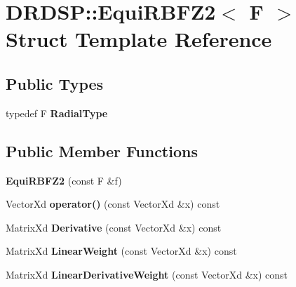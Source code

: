 \hypertarget{struct_d_r_d_s_p_1_1_equi_r_b_f_z2}{\section{D\-R\-D\-S\-P\-:\-:Equi\-R\-B\-F\-Z2$<$ F $>$ Struct Template Reference}
\label{struct_d_r_d_s_p_1_1_equi_r_b_f_z2}
}
\subsection*{Public Types}
\begin{DoxyCompactItemize}
\item 
\hypertarget{struct_d_r_d_s_p_1_1_equi_r_b_f_z2_af128dee1cc8a78c6bb9ff5c70be26cab}{typedef F {\bfseries Radial\-Type}}\label{struct_d_r_d_s_p_1_1_equi_r_b_f_z2_af128dee1cc8a78c6bb9ff5c70be26cab}

\end{DoxyCompactItemize}
\subsection*{Public Member Functions}
\begin{DoxyCompactItemize}
\item 
\hypertarget{struct_d_r_d_s_p_1_1_equi_r_b_f_z2_afbf7a21247ba5f1fd75a127c6e54fcd1}{{\bfseries Equi\-R\-B\-F\-Z2} (const F \&f)}\label{struct_d_r_d_s_p_1_1_equi_r_b_f_z2_afbf7a21247ba5f1fd75a127c6e54fcd1}

\item 
\hypertarget{struct_d_r_d_s_p_1_1_equi_r_b_f_z2_a56eba9d269836f9c4a12ea3b91a07938}{Vector\-Xd {\bfseries operator()} (const Vector\-Xd \&x) const }\label{struct_d_r_d_s_p_1_1_equi_r_b_f_z2_a56eba9d269836f9c4a12ea3b91a07938}

\item 
\hypertarget{struct_d_r_d_s_p_1_1_equi_r_b_f_z2_adc39ceffc61e969ff6307de0aa8f25dc}{Matrix\-Xd {\bfseries Derivative} (const Vector\-Xd \&x) const }\label{struct_d_r_d_s_p_1_1_equi_r_b_f_z2_adc39ceffc61e969ff6307de0aa8f25dc}

\item 
\hypertarget{struct_d_r_d_s_p_1_1_equi_r_b_f_z2_ac153712a0c88279091785e0acc11ec91}{Matrix\-Xd {\bfseries Linear\-Weight} (const Vector\-Xd \&x) const }\label{struct_d_r_d_s_p_1_1_equi_r_b_f_z2_ac153712a0c88279091785e0acc11ec91}

\item 
\hypertarget{struct_d_r_d_s_p_1_1_equi_r_b_f_z2_ac93cce1a551c1cf1044deb3f30d8ed1a}{Matrix\-Xd {\bfseries Linear\-Derivative\-Weight} (const Vector\-Xd \&x) const }\label{struct_d_r_d_s_p_1_1_equi_r_b_f_z2_ac93cce1a551c1cf1044deb3f30d8ed1a}

\end{DoxyCompactItemize}
